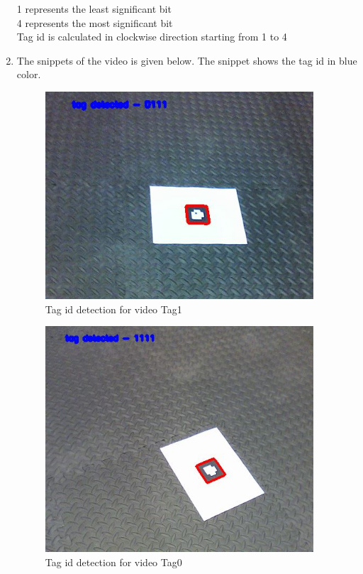 \documentclass[12pt]{article}
\begin{document}
\begin{enumerate}
\begin{center}
    1 represents the least significant bit\\
    4 represents the most significant bit \\
    Tag id is calculated in clockwise direction starting from 1 to 4
\end{center}
\item The snippets of the video is given below. The snippet shows the tag id in blue color.
\begin{figure}[h]
    \centering
    \includegraphics[width=10cm]{tag_id_outputvideo0}
    \caption{Tag id detection for video Tag1}
    \label{fig:Tag id output}
\end{figure}

\begin{figure}[h]
    \centering
    \includegraphics[width=10cm]{tag_id_outputvideo1}
    \caption{Tag id detection for video Tag0}
    \label{fig:Tag id output}
\end{figure}

\end{enumerate}
\end{document}
